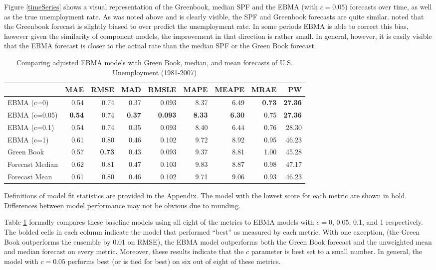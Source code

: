 \documentclass[12pt,fullpage,endnotes]{article}
\begin{document}
Figure \ref{timeSeries} shows a visual representation of the
Greenbook, median SPF and the EBMA (with $c=0.05$) forecasts over
time, as well as the true unemployment rate. As was noted above and is
clearly visible, the SPF and Greenbook forecasts are quite
similar. \citet{Baghestani:2008} noted that the Greenbook forecast is
slightly biased to over predict the unemployment rate. In some periods
EBMA is able to correct this bias, however given the similarity of
component models, the improvement in that direction is rather
small. In general, however, it is easily visible that the EBMA forecast
is closer to the actual rate than the median SPF or the Green Book
forecast.



\begin{table}[h]
\caption{Comparing adjusted EBMA models with Green Book, median, and mean forecasts of U.S. Unemployment (1981-2007)}
\begin{center}
\begin{tabular}{lrrrrrrrr}
\toprule
 & MAE & RMSE & MAD & RMSLE & MAPE & MEAPE & MRAE & PW \\ 
\midrule
 EBMA (c=0)& 0.54 & 0.74 & 0.37 & 0.093 & 8.37 & 6.49 & \textbf{0.73} & \textbf{27.36} \\ 
  EBMA (c=0.05)& \textbf{0.54} & 0.74 &\textbf{ 0.37} & \textbf{0.093} & \textbf{8.33} & \textbf{6.30} & 0.75 & \textbf{27.36} \\ 
 EBMA (c=0.1)& 0.54 & 0.74 & 0.35 & 0.093 & 8.40 & 6.44 & 0.76 & 28.30 \\ 
EBMA (c=1) & 0.61 & 0.80 & 0.46 & 0.102 & 9.72 & 8.92 & 0.95 & 46.23 \\ 
 Green Book& 0.57 & \textbf{0.73} & 0.43 & 0.093 & 9.37 & 8.81 & 1.00 & 45.28 \\ 
 Forecast Median& 0.62 & 0.81 & 0.47 & 0.103 & 9.83 & 8.87 & 0.98 & 47.17 \\ 
Forecast Mean& 0.61 & 0.80 & 0.46 & 0.102 & 9.71 & 9.06 & 0.93 & 46.23 \\ 
\bottomrule
\end{tabular}
\end{center}

\label{compareTable1}
Definitions of model fit statistics are provided in the Appendix. The model with the lowest score for each metric are shown in bold.  Differences between model performance may not be obvious due to rounding.
\end{table}


Table \ref{compareTable1} formally compares these baseline models
using all eight of the metrics to EBMA models with $c=$0, 0.05, 0.1,
and 1 respectively.  The bolded cells in each column indicate the
model that performed ``best'' as measured by each metric.  With one
exception, (the Green Book outperforms the ensemble by 0.01 on RMSE),
the EBMA model outperforms both the Green Book forecast and the
unweighted mean and median forecast on every metric.  Moreover, these
results indicate that the $c$ parameter is best set to a small number.
In general, the model with $c=0.05$ performs best (or is tied for
best) on six out of eight of these metrics.
\end{document}
